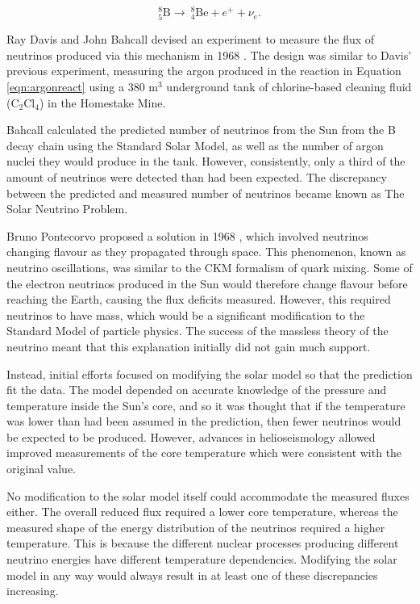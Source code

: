 \begin{equation}
^{8}_{5}\text{B} \rightarrow  \medspace ^{8}_{4} \text{Be} + e^{+} + \nu_e.
\end{equation}

Ray Davis and John Bahcall devised an experiment to measure the flux of neutrinos produced via this mechanism in 1968 \cite{davis2}. The design was similar to Davis' previous experiment, measuring the argon produced in the reaction in Equation \eqref{eqn:argonreact} using a $380$ m$^3$ underground tank of chlorine-based cleaning fluid (C$_{2}$Cl$_{4}$) in the Homestake Mine.

Bahcall calculated the predicted number of neutrinos from the Sun from the B decay chain using the Standard Solar Model, as well as the number of argon nuclei they would produce in the tank. However, consistently, only a third of the amount of neutrinos were detected than had been expected. The discrepancy between the predicted and measured number of neutrinos became known as The Solar Neutrino Problem.

Bruno Pontecorvo proposed a solution in 1968 \cite{pontecorvo}, which involved neutrinos changing flavour as they propagated through space. This phenomenon, known as neutrino oscillations, was similar to the CKM \cite{CKM} \cite{CKM2} formalism of quark mixing. Some of the electron neutrinos produced in the Sun would therefore change flavour before reaching the Earth, causing the flux deficits measured. However, this required neutrinos to have mass, which would be a significant modification to the Standard Model of particle physics. The success of the massless theory of the neutrino meant that this explanation initially did not gain much support.

Instead, initial efforts focused on modifying the solar model so that the prediction fit the data. The model depended on accurate knowledge of the pressure and temperature inside the Sun's core, and so it was thought that if the temperature was lower than had been assumed in the prediction, then fewer neutrinos would be expected to be produced. However, advances in helioseismology allowed improved measurements of the core temperature which were consistent with the original value.

No modification to the solar model itself could accommodate the measured fluxes either. The overall reduced flux required a lower core temperature, whereas the measured shape of the energy distribution of the neutrinos required a higher temperature. This is because the different nuclear processes producing different neutrino energies have different temperature dependencies. Modifying the solar model in any way would always result in at least one of these discrepancies increasing.

